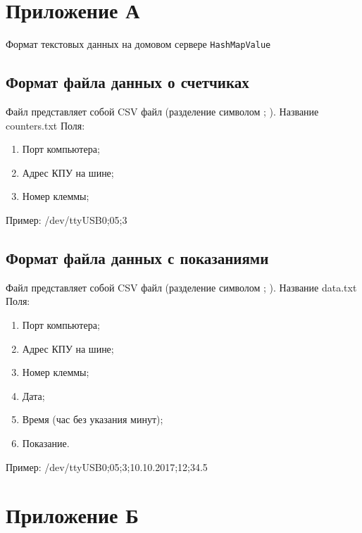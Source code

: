 \documentclass[a4paper,12pt]{article}
\begin{document}
\pagebreak

\printbibliography

\pagebreak

\section*{ \centering Приложение А} 

\begin{center}
Формат текстовых данных на домовом сервере \verb|HashMapValue|
\end{center}

\subsection*{Формат файла данных о счетчиках}
Файл представляет собой CSV файл (разделение символом ; ). Название counters.txt
Поля:
\begin{enumerate}
	\item Порт компьютера;
	\item Адрес КПУ на шине;
	\item Номер клеммы;
\end{enumerate}
Пример: /dev/ttyUSB0;05;3

\subsection*{Формат файла данных с показаниями}
Файл представляет собой CSV файл (разделение символом ; ). Название data.txt
Поля:
\begin{enumerate}
	\item Порт компьютера;
	\item Адрес КПУ на шине;
	\item Номер клеммы;
	\item Дата;
	\item Время (час без указания минут);
	\item Показание.
\end{enumerate}
Пример: /dev/ttyUSB0;05;3;10.10.2017;12;34.5

\section*{ \centering Приложение Б} 
\end{document}

